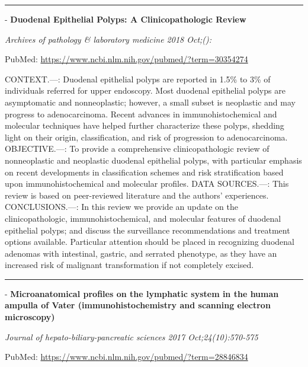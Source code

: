 \documentclass[]{article}
\begin{document}
\begin{center}\rule{0.5\linewidth}{\linethickness}\end{center}

 - \textbf{Duodenal Epithelial Polyps: A Clinicopathologic Review}

\emph{Archives of pathology \& laboratory medicine 2018 Oct;():}

PubMed: \url{https://www.ncbi.nlm.nih.gov/pubmed/?term=30354274}

CONTEXT.---: Duodenal epithelial polyps are reported in 1.5\% to 3\% of
individuals referred for upper endoscopy. Most duodenal epithelial
polyps are asymptomatic and nonneoplastic; however, a small subset is
neoplastic and may progress to adenocarcinoma. Recent advances in
immunohistochemical and molecular techniques have helped further
characterize these polyps, shedding light on their origin,
classification, and risk of progression to adenocarcinoma.
OBJECTIVE.---: To provide a comprehensive clinicopathologic review of
nonneoplastic and neoplastic duodenal epithelial polyps, with particular
emphasis on recent developments in classification schemes and risk
stratification based upon immunohistochemical and molecular profiles.
DATA SOURCES.---: This review is based on peer-reviewed literature and
the authors' experiences. CONCLUSIONS.---: In this review we provide an
update on the clinicopathologic, immunohistochemical, and molecular
features of duodenal epithelial polyps; and discuss the surveillance
recommendations and treatment options available. Particular attention
should be placed in recognizing duodenal adenomas with intestinal,
gastric, and serrated phenotype, as they have an increased risk of
malignant transformation if not completely excised.

{}

{}

\begin{center}\rule{0.5\linewidth}{\linethickness}\end{center}

 - \textbf{Microanatomical profiles on the lymphatic system in the human
ampulla of Vater (immunohistochemistry and scanning electron
microscopy)}

\emph{Journal of hepato-biliary-pancreatic sciences 2017
Oct;24(10):570-575}

PubMed: \url{https://www.ncbi.nlm.nih.gov/pubmed/?term=28846834}
\end{document}
